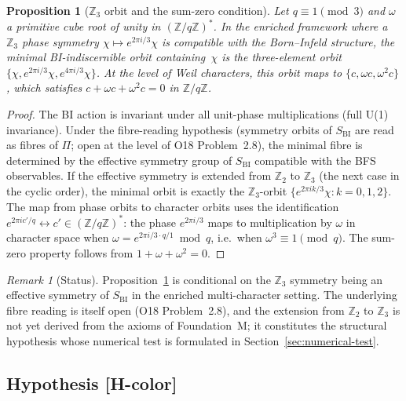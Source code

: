 \documentclass[11pt,a4paper]{article}
\newtheorem{proposition}[theorem]{Proposition}
\theoremstyle{definition}
\theoremstyle{remark}
\newtheorem{remark}[theorem]{Remark}
\newcommand{\Z}{\mathbb{Z}}
\begin{document}
      \begin{proposition}[$\Z_3$ orbit and the sum-zero condition]
        \label{prop:zo3-orbit}
        Let $q \equiv 1 \pmod{3}$ and $\omega$ a primitive cube root of unity in $(\Z/q\Z)^*$.
        In the enriched framework where a $\Z_3$ phase symmetry $\chi \mapsto e^{2\pi i/3}\chi$ is
        compatible with the Born--Infeld structure, the minimal BI-indiscernible orbit containing~$\chi$
        is the three-element orbit $\{\chi, e^{2\pi i/3}\chi, e^{4\pi i/3}\chi\}$.
        At the level of Weil characters, this orbit maps to $\{c, \omega c, \omega^2 c\}$, which
        satisfies $c + \omega c + \omega^2 c = 0$ in $\Z/q\Z$.
      \end{proposition}

      \begin{proof}
        The BI action is invariant under all unit-phase multiplications (full U(1) invariance).
        Under the fibre-reading hypothesis (symmetry orbits of $S_{\mathrm{BI}}$ are read as
        fibres of $\Pi$; open at the level of O18 Problem~2.8), the minimal fibre is determined
        by the effective
        symmetry group of $S_{\mathrm{BI}}$ compatible with the BFS observables.
        If the effective symmetry is extended from $\Z_2$ to $\Z_3$ (the next case in the cyclic order),
        the minimal orbit is exactly the $\Z_3$-orbit $\{e^{2\pi i k/3}\chi : k = 0,1,2\}$.
        The map from phase orbits to character orbits uses the identification $e^{2\pi i c'/q} \leftrightarrow
        c' \in (\Z/q\Z)^*$: the phase $e^{2\pi i/3}$ maps to multiplication by $\omega$ in character
        space when $\omega = e^{2\pi i/3 \cdot q/1} \bmod q$, i.e.\ when $\omega^3 \equiv 1 \pmod{q}$.
        The sum-zero property follows from $1 + \omega + \omega^2 = 0$.
      \end{proof}

      \begin{remark}[Status]
Proposition~\ref{prop:zo3-orbit} is conditional on the $\Z_3$ symmetry being an effective
symmetry of $S_{\mathrm{BI}}$ in the enriched multi-character setting.
The underlying fibre reading is itself open (O18 Problem~2.8), and
the extension from $\Z_2$ to $\Z_3$ is not yet derived from the axioms of Foundation~M;
it constitutes the structural hypothesis whose numerical test is formulated in
Section~\ref{sec:numerical-test}.
      \end{remark}

    \subsection{Hypothesis [H-color]}
      \label{ssec:h-color}
\end{document}
